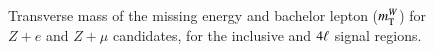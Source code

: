 \begin{figure}[htb]
{  }
   \\
  \caption{Transverse mass of the missing energy and bachelor lepton ($m_{\mathrm{T}}^W$) for $Z+e$ and $Z+\mu$ candidates, for the inclusive and $4\ell$ signal regions.}
  \label{fig:SR-mTW-1}
\end{figure}

\clearpage

